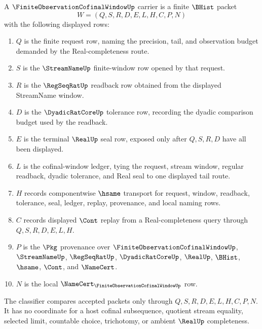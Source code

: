 \begin{definition}
\label{def:finite-observation-cofinal-window-carrier}
A $\FiniteObservationCofinalWindowUp$ carrier is a finite $\BHist$ packet
$$
W=(Q,S,R,D,E,L,H,C,P,N)
$$
with the following displayed rows:
\begin{enumerate}
\item $Q$ is the finite request row, naming the precision, tail, and observation budget demanded by the Real-completeness route.
\item $S$ is the $\StreamNameUp$ finite-window row opened by that request.
\item $R$ is the $\RegSeqRatUp$ readback row obtained from the displayed StreamName window.
\item $D$ is the $\DyadicRatCoreUp$ tolerance row, recording the dyadic comparison budget used by the readback.
\item $E$ is the terminal $\RealUp$ seal row, exposed only after $Q,S,R,D$ have all been displayed.
\item $L$ is the cofinal-window ledger, tying the request, stream window, regular readback, dyadic tolerance, and Real seal to one displayed tail route.
\item $H$ records componentwise $\hsame$ transport for request, window, readback, tolerance, seal, ledger, replay, provenance, and local naming rows.
\item $C$ records displayed $\Cont$ replay from a Real-completeness query through $Q,S,R,D,E,L,H$.
\item $P$ is the $\Pkg$ provenance over $\FiniteObservationCofinalWindowUp$, $\StreamNameUp$, $\RegSeqRatUp$, $\DyadicRatCoreUp$, $\RealUp$, $\BHist$, $\hsame$, $\Cont$, and $\NameCert$.
\item $N$ is the local $\NameCert_{\FiniteObservationCofinalWindowUp}$ row.
\end{enumerate}
The classifier compares accepted packets only through $Q,S,R,D,E,L,H,C,P,N$. It has no coordinate for a host cofinal subsequence, quotient stream equality, selected limit, countable choice, trichotomy, or ambient $\RealUp$ completeness.
\end{definition}

